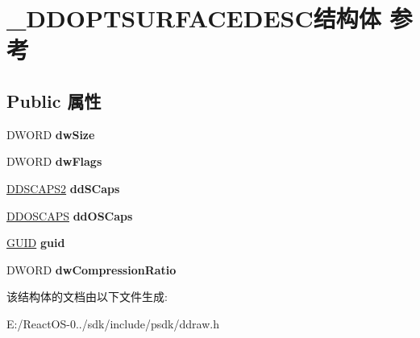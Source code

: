 \hypertarget{struct___d_d_o_p_t_s_u_r_f_a_c_e_d_e_s_c}{}\section{\+\_\+\+D\+D\+O\+P\+T\+S\+U\+R\+F\+A\+C\+E\+D\+E\+S\+C结构体 参考}
\label{struct___d_d_o_p_t_s_u_r_f_a_c_e_d_e_s_c}
\subsection*{Public 属性}
\begin{DoxyCompactItemize}
\item 
\mbox{\label{struct___d_d_o_p_t_s_u_r_f_a_c_e_d_e_s_c_aa1e55c8ec22e3905efd182c9ab6f36a4}} 
D\+W\+O\+RD {\bfseries dw\+Size}
\item 
\mbox{\label{struct___d_d_o_p_t_s_u_r_f_a_c_e_d_e_s_c_a4cc3c6769ecb4ec0d6f9f30fa503f71a}} 
D\+W\+O\+RD {\bfseries dw\+Flags}
\item 
\mbox{\label{struct___d_d_o_p_t_s_u_r_f_a_c_e_d_e_s_c_a753c2f8c2416a52ec7339c122a3ceb26}} 
\hyperlink{struct___d_d_s_c_a_p_s2}{D\+D\+S\+C\+A\+P\+S2} {\bfseries dd\+S\+Caps}
\item 
\mbox{\label{struct___d_d_o_p_t_s_u_r_f_a_c_e_d_e_s_c_a8542e1d061d129cbde53e4c807ba0940}} 
\hyperlink{struct___d_d_o_s_c_a_p_s}{D\+D\+O\+S\+C\+A\+PS} {\bfseries dd\+O\+S\+Caps}
\item 
\mbox{\label{struct___d_d_o_p_t_s_u_r_f_a_c_e_d_e_s_c_a7b04c404074877c8d28aff86086fc1e6}} 
\hyperlink{interface_g_u_i_d}{G\+U\+ID} {\bfseries guid}
\item 
\mbox{\label{struct___d_d_o_p_t_s_u_r_f_a_c_e_d_e_s_c_a7f2a8e9ae74858bcc7806649f5367639}} 
D\+W\+O\+RD {\bfseries dw\+Compression\+Ratio}
\end{DoxyCompactItemize}


该结构体的文档由以下文件生成\+:\begin{DoxyCompactItemize}
\item 
E\+:/\+React\+O\+S-\/0../sdk/include/psdk/ddraw.\+h\end{DoxyCompactItemize}
